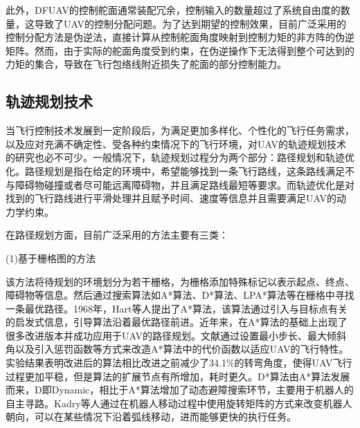 此外，DFUAV的控制舵面通常装配冗余，控制输入的数量超过了系统自由度的数量，这导致了UAV的控制分配问题\cite{naldiPrototypeDuctedFanAerial2014b}。为了达到期望的控制效果，目前广泛采用的控制分配方法是伪逆法\cite{peddlePracticalHoverFlight2009a,pflimlinPositionControlDucted2007b,shengNearHoverAdaptiveAttitude2015b}，直接计算从控制舵面角度映射到控制力矩的非方阵的伪逆矩阵。然而，由于实际的舵面角度受到约束，在伪逆操作下无法得到整个可达到的力矩的集合\cite{durhamAircraftControlAllocation2017a}，导致在飞行包络线附近损失了舵面的部分控制能力\cite{HKXB202010026}。

\subsection{轨迹规划技术}

当飞行控制技术发展到一定阶段后，为满足更加多样化、个性化的飞行任务需求，以及应对充满不确定性、受各种约束情况下的飞行环境，对UAV的轨迹规划技术的研究也必不可少。一般情况下，轨迹规划过程分为两个部分：路径规划和轨迹优化。路径规划是指在给定的环境中，希望能够找到一条飞行路线，这条路线满足不与障碍物碰撞或者尽可能远离障碍物，并且满足路线最短等要求。而轨迹优化是对找到的飞行路线进行平滑处理并且赋予时间、速度等信息并且需要满足UAV的动力学约束。

在路径规划方面，目前广泛采用的方法主要有三类：

(1)基于栅格图的方法

    该方法将待规划的环境划分为若干栅格，为栅格添加特殊标记以表示起点、终点、障碍物等信息。然后通过搜索算法如A*算法、D*算法、LPA*算法等在栅格中寻找一条最优路径。1968年，Hart等人提出了A*算法\cite{hartFormalBasisHeuristic1968}，该算法通过引入与目标点有关的启发式信息，引导算法沿着最优路径前进。近年来，在A*算法的基础上出现了很多改进版本并成功应用于UAV的路径规划。文献\cite{liImprovedASTARAlgorithm2024}通过设置最小步长、最大倾斜角以及引入惩罚函数等方式来改造A*算法中的代价函数以适应UAV的飞行特性。实验结果表明改进后的算法相比改进之前减少了34.1\%的转弯角度，使得UAV飞行过程更加平稳，但是算法的扩展节点有所增加，耗时更久。D*算法由A*算法发展而来，D即Dynamic，相比于A*算法增加了动态避障搜索环节，主要用于机器人的自主寻路。Kadry等人通过在机器人移动过程中使用旋转矩阵的方式来改变机器人朝向，可以在某些情况下沿着弧线移动，进而能够更快的执行任务\cite{kadryPathOptimizationDstar2022}。


